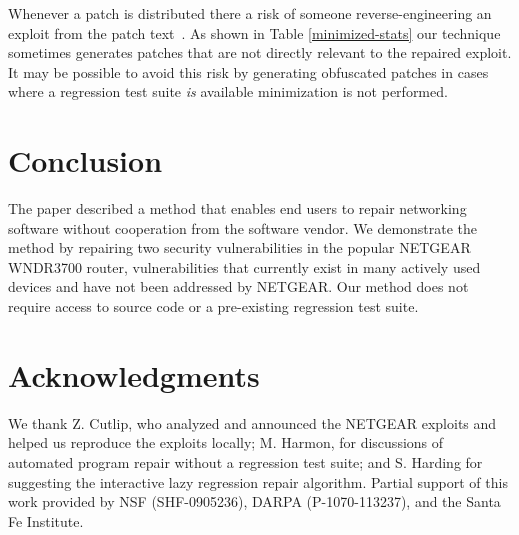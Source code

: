 \documentclass{sigcomm-alternate}
\begin{document}


Whenever a patch is distributed there a risk of someone
reverse-engineering an exploit from the patch
text~\cite{brumley2008automatic}.  As shown in Table
\ref{minimized-stats} our technique sometimes generates patches that
are not directly relevant to the repaired exploit.  It may be possible
to avoid this risk by generating obfuscated patches in cases where a
regression test suite \emph{is} available minimization is not
performed.

\section{Conclusion}

The paper described a method that enables end users to repair networking
software without cooperation from the software vendor.  We demonstrate
the method by repairing two security vulnerabilities in the popular
NETGEAR WNDR3700 router, vulnerabilities that currently exist in many
actively used devices and have not been addressed by NETGEAR.  Our
method does not require access to source code or a pre-existing
regression test suite.

\section{Acknowledgments}
\label{sec-7}
We thank Z. Cutlip, who analyzed and announced
the NETGEAR exploits and helped us reproduce the exploits
locally;
M. Harmon, for discussions of automated program repair without a
regression test suite; and S. Harding for suggesting the
interactive lazy regression repair algorithm.  
Partial support of this work provided by NSF (SHF-0905236),
DARPA (P-1070-113237), and the Santa Fe Institute.


\small

\end{document}
